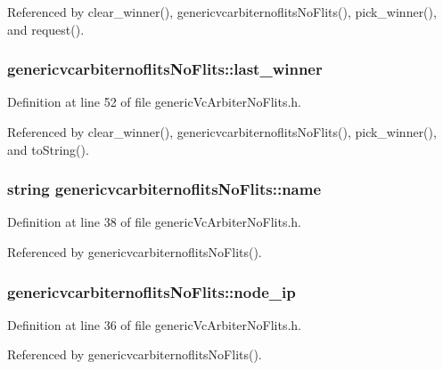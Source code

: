 Referenced by clear\_\-winner(), genericvcarbiternoflitsNoFlits(), pick\_\-winner(), and request().
\subsubsection[{last\_\-winner}]{ {\bf genericvcarbiternoflitsNoFlits::last\_\-winner}\hspace{0.3cm}{\tt  [private]}}\label{classgenericvcarbiternoflitsNoFlits_b0be12b7ac81e3a22098252a6bc44bc0}




Definition at line 52 of file genericVcArbiterNoFlits.h.

Referenced by clear\_\-winner(), genericvcarbiternoflitsNoFlits(), pick\_\-winner(), and toString().
\subsubsection[{name}]{\setlength{\rightskip}{0pt plus 5cm}string {\bf genericvcarbiternoflitsNoFlits::name}}\label{classgenericvcarbiternoflitsNoFlits_9f7e29c9d9d8568b3178082ed6c76f4e}




Definition at line 38 of file genericVcArbiterNoFlits.h.

Referenced by genericvcarbiternoflitsNoFlits().
\subsubsection[{node\_\-ip}]{ {\bf genericvcarbiternoflitsNoFlits::node\_\-ip}}\label{classgenericvcarbiternoflitsNoFlits_17c531b8bb9df1098347bdfdf50f8bc9}




Definition at line 36 of file genericVcArbiterNoFlits.h.

Referenced by genericvcarbiternoflitsNoFlits().
